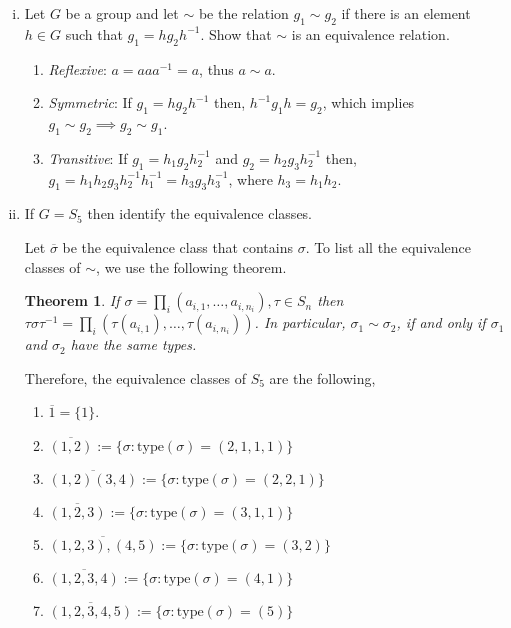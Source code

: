 \documentclass[12pt]{article}
\begin{document}
  \begin{enumerate}[(i)]
    \item Let $G$ be a group and let $\sim$ be the relation $g_1 \sim g_2$ if there is an element $h \in G$ such that $g_1 = hg_2h^{-1}$. Show that $\sim$ is an equivalence relation.

    \noindent
    \begin{enumerate}
        \item \textit{Reflexive}: $a = aaa^{-1} = a$, thus $a \sim a$.
        \item \textit{Symmetric}: If $g_1 = hg_2h^{-1}$ then, $h^{-1} g_1 h =  g_2$,  which implies $g_1 \sim g_2 \implies g_2 \sim g_1$.
        \item \textit{Transitive}: If $g_1 = h_1g_2h_2^{-1}$ and $g_2 = h_2g_3h_2^{-1}$  then, $g_1 = h_1 h_2 g_3 h_2^{-1}h_1^{-1} =  h_3g_3h_3^{-1}$, where $h_3 = h_1h_2$.
    \end{enumerate}

    \item If $G = S_5$ then identify the equivalence classes.

    \noindent Let $\overline{\sigma}$ be the equivalence class that contains $\sigma$. To list all the equivalence classes of $\sim$, we use the following theorem.
    \newtheorem{thm}{Theorem}
    \begin{thm}
        If $\sigma = \prod_i (a_{i, 1}, \dots, a_{i, n_i}), \tau \in S_n$ then $\tau \sigma \tau^{-1} = \prod_i (\tau(a_{i, 1}), \dots, \tau(a_{i, n_i}))$. In particular,  $\sigma_1 \sim \sigma_2$, if and only if $\sigma_1$ and $\sigma_2$ have the same types.
    \end{thm}
    Therefore, the equivalence classes of $S_5$ are the following, 
     \begin{enumerate}[(1)]
         \item $\overline{1} = \{1\}$.
         \item $\overline{(1,2)} := \{\sigma: \mathrm{type}(\sigma) = (2, 1, 1, 1)\}$
         \item $\overline{(1,2)(3,4)} := \{\sigma: \mathrm{type}(\sigma) = (2, 2, 1)\}$
         \item $\overline{(1,2,3)} := \{\sigma: \mathrm{type}(\sigma) = (3, 1, 1)\}$
         \item $\overline{(1,2,3), (4, 5)} := \{\sigma: \mathrm{type}(\sigma) = (3, 2)\}$
        \item $\overline{(1,2,3,4)} := \{\sigma: \mathrm{type}(\sigma) = (4, 1)\}$
        \item $\overline{(1,2,3,4,5)} := \{\sigma: \mathrm{type}(\sigma) = (5)\}$
         
     \end{enumerate} 
    
  \end{enumerate}
\end{document}
